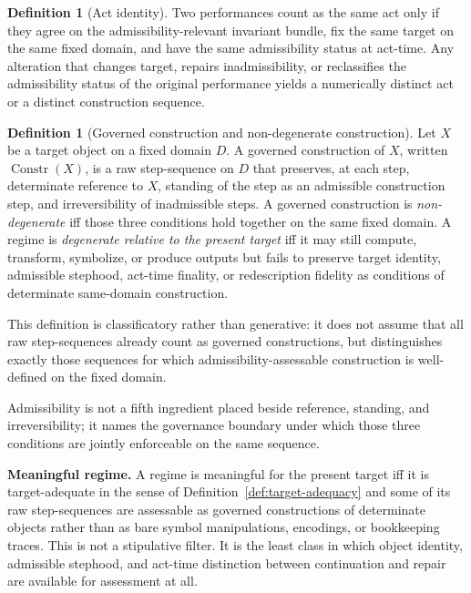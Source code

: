 \documentclass[11pt]{article}
\theoremstyle{definition}
\newtheorem{definition}[theorem]{Definition}
\theoremstyle{remark}
\newcommand{\Constr}{\operatorname{Constr}}
\begin{document}
\begin{definition}[Act identity]\label{def:act-identity}
Two performances count as the same act only if they agree on the admissibility-relevant invariant bundle, fix the same target on the same fixed domain, and have the same admissibility status at act-time. Any alteration that changes target, repairs inadmissibility, or reclassifies the admissibility status of the original performance yields a numerically distinct act or a distinct construction sequence.
\end{definition}

\begin{definition}[Governed construction and non-degenerate construction]\label{def:governed-construction}
Let $X$ be a target object on a fixed domain $D$. A governed construction of $X$, written $\Constr(X)$, is a raw step-sequence on $D$ that preserves, at each step, determinate reference to $X$, standing of the step as an admissible construction step, and irreversibility of inadmissible steps. A governed construction is \emph{non-degenerate} iff those three conditions hold together on the same fixed domain. A regime is \emph{degenerate relative to the present target} iff it may still compute, transform, symbolize, or produce outputs but fails to preserve target identity, admissible stephood, act-time finality, or redescription fidelity as conditions of determinate same-domain construction.

This definition is classificatory rather than generative: it does not assume that all raw step-sequences already count as governed constructions, but distinguishes exactly those sequences for which admissibility-assessable construction is well-defined on the fixed domain.

Admissibility is not a fifth ingredient placed beside reference, standing, and irreversibility; it names the governance boundary under which those three conditions are jointly enforceable on the same sequence.
\end{definition}

\medskip
\noindent\textbf{Meaningful regime.} A regime is meaningful for the present target iff it is target-adequate in the sense of Definition~\ref{def:target-adequacy} and some of its raw step-sequences are assessable as governed constructions of determinate objects rather than as bare symbol manipulations, encodings, or bookkeeping traces. This is not a stipulative filter. It is the least class in which object identity, admissible stephood, and act-time distinction between continuation and repair are available for assessment at all.
\end{document}
